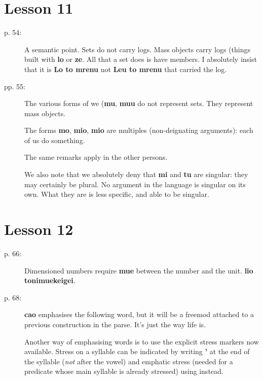 \documentclass[12pt]{article}
\begin{document}
\section{Lesson 11}

\begin{description}


\item[p. 54:]  A semantic point.  Sets do not carry logs.  Mass objects carry logs (things built with {\bf lo} or {\bf ze}.
All that a set does is have members.  I absolutely insist that it is {\bf Lo to mrenu} not {\bf Leu to mrenu} that carried the log.

\item[pp. 55:]   The various forms of we ({\bf mu}, {\bf muu} do not represent sets.  They represent mass objects.

The forms {\bf mo}, {\bf mio}, {\bf mio} are multiples (non-deignating arguments):  each of us do something.

The same remarks apply in the other persons.

We also note that we absolutely deny that {\bf mi} and {\bf tu} are singular:  they may certainly be plural.  No argument in the language is singular on its own.  What they are is less specific, and able to be singular.


\end{description}

\section{Lesson 12}

\begin{description}

\item[p. 66:]  Dimensioned numbers require {\bf mue} between the number and the unit.  {\bf lio tonimuekeigei}.

\item[p. 68:]  {\bf cao} emphasises the following word, but it will be a freemod attached to a previous construction in the parse.  It's just the way life is.

Another way of emphasising words is to use the explicit stress markers now available.  Stress on a syllable can be indicated by writing {\bf '} at the end of the syllable ({\em not\/} after the vowel) and emphatic stress (needed for a predicate whose main syllable is already stressed) using {\bf *} instead.

\end{description}
\end{document}
